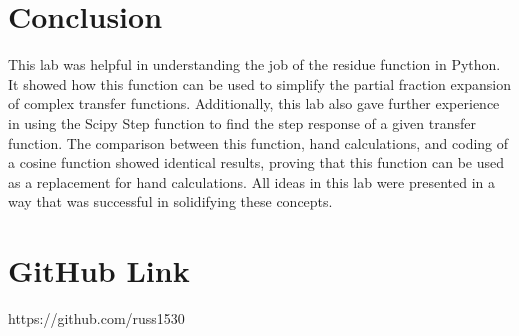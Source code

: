 \documentclass[12pt, titlepage]{article}
\begin{document}
       \clearpage
       \section{Conclusion}
            This lab was helpful in understanding the job of the residue function in Python.  It showed how this function can be used to simplify the partial fraction expansion of complex transfer functions.  Additionally, this lab also gave further experience in using the Scipy Step function to find the step response of a given transfer function.  The comparison between this function, hand calculations, and coding of a cosine function showed identical results, proving that this function can be used as a replacement for hand calculations. All ideas in this lab were presented in a way that was successful in solidifying these concepts.
      
        \section{GitHub Link}
        https://github.com/russ1530
\end{document}
